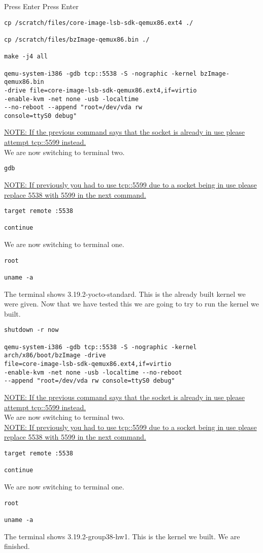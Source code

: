 \documentclass[journal,10pt,onecolumn,letterpaper,draftclsnofoot]{IEEEtran}
\begin{document}
Press Enter\newline
Press Enter\newline
\begin{verbatim}
cp /scratch/files/core-image-lsb-sdk-qemux86.ext4 ./

cp /scratch/files/bzImage-qemux86.bin ./

make -j4 all

qemu-system-i386 -gdb tcp::5538 -S -nographic -kernel bzImage-qemux86.bin 
-drive file=core-image-lsb-sdk-qemux86.ext4,if=virtio 
-enable-kvm -net none -usb -localtime 
--no-reboot --append "root=/dev/vda rw 
console=ttyS0 debug"
\end{verbatim}
\underline{NOTE: If the previous command says that the socket is already in use please attempt tcp::5599 instead.}
\newline
\\
We are now switching to terminal two.
\begin{verbatim}
gdb
\end{verbatim}
\underline{NOTE: If previously you had to use tcp::5599 due to a socket being in use please replace 5538 with 5599 in the next command.}
\begin{verbatim}
target remote :5538

continue
\end{verbatim}
We are now switching to terminal one.
\begin{verbatim}
root

uname -a
\end{verbatim}
The terminal shows 3.19.2-yocto-standard.
This is the already built kernel we were given.\newline
Now that we have tested this we are going to try to run the kernel we built.
\begin{verbatim}
shutdown -r now

qemu-system-i386 -gdb tcp::5538 -S -nographic -kernel 
arch/x86/boot/bzImage -drive 
file=core-image-lsb-sdk-qemux86.ext4,if=virtio 
-enable-kvm -net none -usb -localtime --no-reboot 
--append "root=/dev/vda rw console=ttyS0 debug"
\end{verbatim}
\underline{NOTE: If the previous command says that the socket is already in use please attempt tcp::5599 instead.}
\newline
\\
We are now switching to terminal two.\newline
\\
\underline{NOTE: If previously you had to use tcp::5599 due to a socket being in use please replace 5538 with 5599 in the next command.}
\begin{verbatim}
target remote :5538

continue
\end{verbatim}
We are now switching to terminal one.
\begin{verbatim}
root

uname -a
\end{verbatim}
The terminal shows 3.19.2-group38-hw1.\newline
This is the kernel we built.\newline
We are finished.
\end{document}
